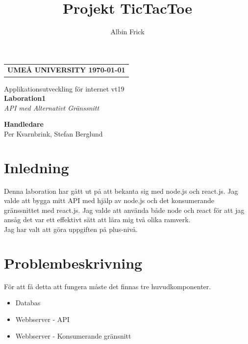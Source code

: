 \documentclass{article}
\title{Projekt TicTacToe}
\author{Albin Frick}
\def\typeofdoc{Report}
\def\course{Applikationsutveckling för internet vt19}
\def\graders{Per Kvarnbrink, Stefan Berglund}
\begin{document}
	\begin{titlepage}
		\thispagestyle{empty}
		\begin{large}
			\begin{tabular}{@{}p{\textwidth}@{}}
				\textbf{UMEÅ UNIVERSITY \hfill \today} \\
			\end{tabular}
		\end{large}
		\begin{center}
			\vspace{15mm}
			\large{\course} \\
			\vspace{5mm}
			\huge{\textbf{Laboration1}}\\
			\vspace{5mm}
			\large{\emph{API med Alternativt Gränssnitt}}\\
			\vspace{10mm}
			\large{\theauthor}
		\end{center}
		\begin{center}
			\vfill
			\large{\textbf{Handledare}}\\
			\vspace{1mm}
			\large{\graders}
		\end{center}

	\end{titlepage}
\newpage
\tableofcontents
\newpage
\section{Inledning}%
\label{sec:inledning}
Denna laboration har gått ut på att bekanta sig med node.js och react.js.
Jag valde att bygga mitt API med hjälp av node.js och det konsumerande gränssnittet med react.js.
Jag valde att använda både node och react för att jag ansåg det var ett effektivt sätt att lära mig två olika ramverk.\\

\noindent
Jag har valt att göra uppgiften på plus-nivå.

\section{Problembeskrivning}%
\label{sec:problembeskrivning}
För att få detta att fungera måste det finnas tre huvudkomponenter.
\begin{itemize}
	\item Databas
	\item Webbserver - API
	\item Webbserver - Konsumerande gränsnitt
\end{itemize}
\end{document}
